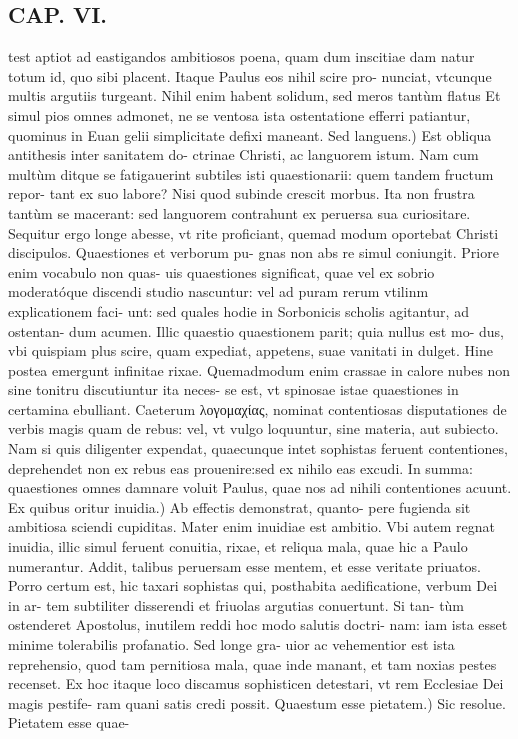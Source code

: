 \documentclass{article}
\begin{document}
\begin{pages}
\section*{CAP. VI. }
\marginpar{[ p.75 ]}\pstart test aptiot ad eastigandos ambitiosos poena, quam dum inscitiae dam natur totum id, quo sibi placent. Itaque Paulus eos nihil scire pro- nunciat, vtcunque multis argutiis turgeant. Nihil enim habent solidum, sed meros tantùm flatus Et simul pios omnes admonet, ne se ventosa ista ostentatione efferri patiantur, quominus in Euan gelii simplicitate defixi maneant.  \pend\pstart Sed languens.) Est obliqua antithesis inter sanitatem do- ctrinae Christi, ac languorem istum. Nam cum multùm ditque se fatigauerint subtiles isti quaestionarii: quem tandem fructum repor- tant ex suo labore? Nisi quod subinde crescit morbus. Ita non frustra tantùm se macerant: sed languorem contrahunt ex peruersa sua curiositare. Sequitur ergo longe abesse, vt rite proficiant, quemad modum oportebat Christi discipulos. Quaestiones et verborum pu- gnas non abs re simul coniungit. Priore enim vocabulo non quas- uis quaestiones significat, quae vel ex sobrio moderatóque discendi studio nascuntur: vel ad puram rerum vtilinm explicationem faci- unt: sed quales hodie in Sorbonicis scholis agitantur, ad ostentan- dum acumen. Illic quaestio quaestionem parit; quia nullus est mo- dus, vbi quispiam plus scire, quam expediat, appetens, suae vanitati in dulget. Hine postea emergunt infinitae rixae. Quemadmodum enim crassae in calore nubes non sine tonitru discutiuntur ita neces- se est, vt spinosae istae quaestiones in certamina ebulliant. Caeterum λογομαχίας, nominat contentiosas disputationes de verbis magis quam de rebus: vel, vt vulgo loquuntur, sine materia, aut subiecto. Nam si quis diligenter expendat, quaecunque intet sophistas feruent contentiones, deprehendet non ex rebus eas prouenire:sed ex nihilo eas excudi. In summa: quaestiones omnes damnare voluit Paulus, quae nos ad nihili contentiones acuunt.  \pend\pstart Ex quibus oritur inuidia.) Ab effectis demonstrat, quanto- pere fugienda sit ambitiosa sciendi cupiditas. Mater enim inuidiae est ambitio. Vbi autem regnat inuidia, illic simul feruent conuitia, rixae, et reliqua mala, quae hic a Paulo numerantur. Addit, talibus peruersam esse mentem, et esse veritate priuatos. Porro certum est, hic taxari sophistas qui, posthabita aedificatione, verbum Dei in ar- tem subtiliter disserendi et friuolas argutias conuertunt. Si tan- tùm ostenderet Apostolus, inutilem reddi hoc modo salutis doctri- nam: iam ista esset minime tolerabilis profanatio. Sed longe gra- uior ac vehementior est ista reprehensio, quod tam pernitiosa mala, quae inde manant, et tam noxias pestes recenset. Ex hoc itaque loco discamus sophisticen detestari, vt rem Ecclesiae Dei magis pestife- ram quani satis credi possit.  \pend\pstart Quaestum esse pietatem.) Sic resolue. Pietatem esse quae-  \pend

\end{pages}
\end{document}

